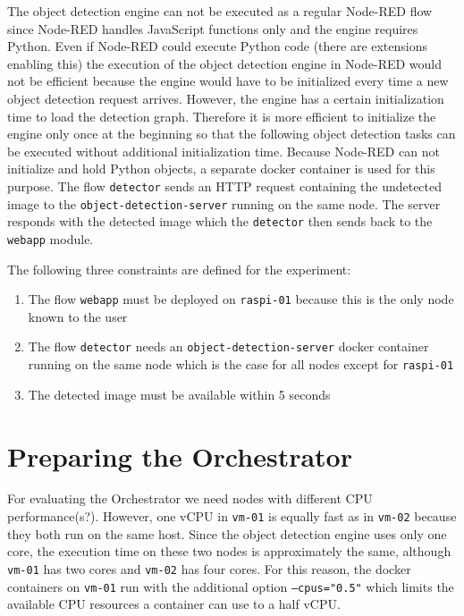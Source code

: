 The object detection engine can not be executed as a regular Node-RED flow since Node-RED handles JavaScript functions only and the engine requires Python. Even if Node-RED could execute Python code (there are extensions enabling this) the execution of the object detection engine in Node-RED would not be efficient because the engine would have to be initialized every time a new object detection request arrives. However, the engine has a certain initialization time to load the detection graph. Therefore it is more efficient to initialize the engine only once at the beginning so that the following object detection tasks can be executed without additional initialization time. Because Node-RED can not initialize and hold Python objects, a separate docker container is used for this purpose. The flow \texttt{detector} sends an HTTP request containing the undetected image to the \texttt{object-detection-server} running on the same node. The server responds with the detected image which the \texttt{detector} then sends back to the \texttt{webapp} module.

The following three constraints are defined for the experiment:
\begin{enumerate}
    \item The flow \texttt{webapp} must be deployed on \texttt{raspi-01} because this is the only node known to the user
    \item The flow \texttt{detector} needs an \texttt{object-detection-server} docker container running on the same node which is the case for all nodes except for \texttt{raspi-01}
    \item The detected image must be available within 5 seconds
\end{enumerate}








\section{Preparing the Orchestrator\label{sec:eval-preparing-the-orchestrator}}

For evaluating the Orchestrator we need nodes with different CPU performance(s?).
However, one vCPU in \texttt{vm-01} is equally fast as in \texttt{vm-02} because they both run on the same host.
Since the object detection engine uses only one core, the execution time on these two nodes is approximately the same, although \texttt{vm-01} has two cores and \texttt{vm-02} has four cores. For this reason, the docker containers on \texttt{vm-01} run with the additional option \texttt{---cpus="0.5"} which limits the available CPU resources a container can use to a half vCPU.

